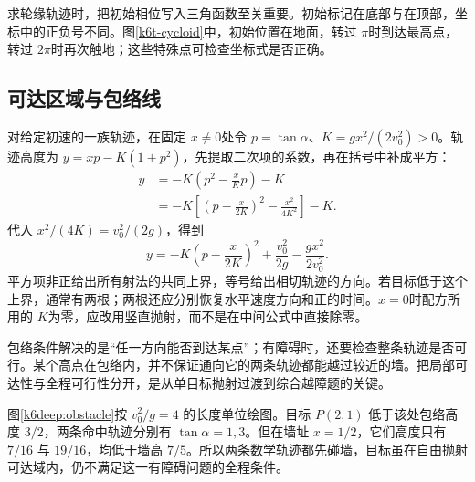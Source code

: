 求轮缘轨迹时，把初始相位写入三角函数至关重要。初始标记在底部与在顶部，坐标中的正负号不同。图\ref{k6t-cycloid}中，初始位置在地面，转过 $\pi$时到达最高点，转过 $2\pi$时再次触地；这些特殊点可检查坐标式是否正确。

\subsection{可达区域与包络线}
对给定初速的一族轨迹，在固定 $x\ne0$处令 $p=\tan\alpha$、$K=gx^2/(2v_0^2)>0$。轨迹高度为 $y=xp-K(1+p^2)$，先提取二次项的系数，再在括号中补成平方：
\begin{align*}
 y&=-K\left(p^2-\frac xKp\right)-K\\
 &=-K\left[\left(p-\frac{x}{2K}\right)^2
 -\frac{x^2}{4K^2}\right]-K.
\end{align*}
代入 $x^2/(4K)=v_0^2/(2g)$，得到
\[y=-K\left(p-\frac{x}{2K}\right)^2
+\frac{v_0^2}{2g}-\frac{gx^2}{2v_0^2}.
\]
平方项非正给出所有射法的共同上界，等号给出相切轨迹的方向。若目标低于这个上界，通常有两根；两根还应分别恢复水平速度方向和正的时间。$x=0$时配方所用的 $K$为零，应改用竖直抛射，而不是在中间公式中直接除零。

包络条件解决的是“任一方向能否到达某点”；有障碍时，还要检查整条轨迹是否可行。某个高点在包络内，并不保证通向它的两条轨迹都能越过较近的墙。把局部可达性与全程可行性分开，是从单目标抛射过渡到综合越障题的关键。



图\ref{k6deep:obstacle}按 $v_0^2/g=4$ 的长度单位绘图。目标 $P(2,1)$ 低于该处包络高度 $3/2$，两条命中轨迹分别有 $\tan\alpha=1,3$。但在墙址 $x=1/2$，它们高度只有 $7/16$ 与 $19/16$，均低于墙高 $7/5$。所以两条数学轨迹都先碰墙，目标虽在自由抛射可达域内，仍不满足这一有障碍问题的全程条件。

